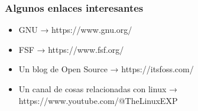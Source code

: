 \documentclass[10pt]{beamer}
\begin{document}
	\begin{frame}
		\frametitle{Algunos enlaces interesantes}
		\begin{itemize}
			\item GNU → https://www.gnu.org/
			\item FSF → https://www.fsf.org/
			\item Un blog de Open Source → https://itsfoss.com/
			\item Un canal de cosas relacionadas con linux → https://www.youtube.com/@TheLinuxEXP
		\end{itemize}
	\end{frame}
\end{document}
